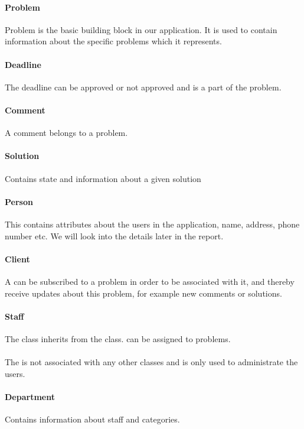 \paragraph{Problem}
Problem is the basic building block in our application. It is used to contain information about the specific problems which it represents.

\paragraph{Deadline} The deadline can be approved or not approved and is a part of the problem. 

\paragraph{Comment} A comment belongs to a problem. 

\paragraph{Solution}
Contains state and information about a given solution

\paragraph{Person}
This contains attributes about the users in the application, name, address, phone number etc. We will look into the details later in the report.

\paragraph{Client} A \aclient[] can be subscribed to a problem in order to be associated with it, and thereby receive updates about this problem, for example new comments or solutions.
 
\paragraph{Staff}
The \astaff[] class inherits from the \aclient[] class.
\astaff[] can be assigned to problems. 

\paragraph{\Admin[]} The \admin[] is not associated with any other classes and is only used to administrate the users. 

\paragraph{Department}
Contains information about staff and categories. 


